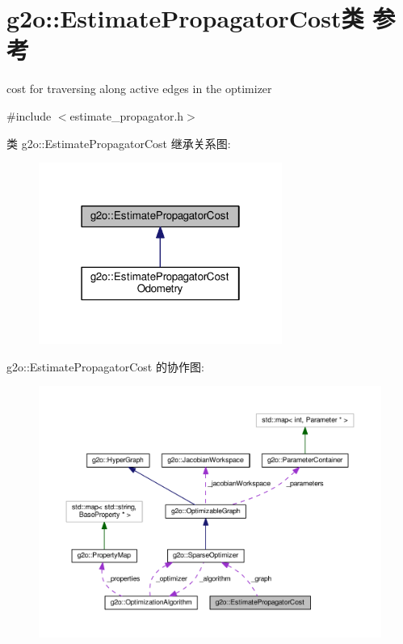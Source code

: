 \hypertarget{classg2o_1_1EstimatePropagatorCost}{\section{g2o\-:\-:Estimate\-Propagator\-Cost类 参考}
\label{classg2o_1_1EstimatePropagatorCost}
}


cost for traversing along active edges in the optimizer  




{\ttfamily \#include $<$estimate\-\_\-propagator.\-h$>$}



类 g2o\-:\-:Estimate\-Propagator\-Cost 继承关系图\-:
\nopagebreak
\begin{figure}[H]
\begin{center}
\leavevmode
\includegraphics[width=226pt]{classg2o_1_1EstimatePropagatorCost__inherit__graph}
\end{center}
\end{figure}


g2o\-:\-:Estimate\-Propagator\-Cost 的协作图\-:
\nopagebreak
\begin{figure}[H]
\begin{center}
\leavevmode
\includegraphics[width=350pt]{classg2o_1_1EstimatePropagatorCost__coll__graph}
\end{center}
\end{figure}
